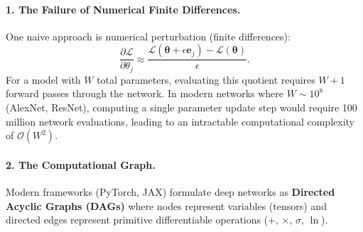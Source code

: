 \paragraph{1. The Failure of Numerical Finite Differences.}
One naive approach is numerical perturbation (finite differences):
\begin{equation}
\frac{\partial \mathcal{L}}{\partial \theta_j} \approx \frac{\mathcal{L}(\boldsymbol{\theta} + \epsilon \mathbf{e}_j) - \mathcal{L}(\boldsymbol{\theta})}{\epsilon}.
\end{equation}
For a model with $W$ total parameters, evaluating this quotient requires $W + 1$ forward passes through the network. In modern networks where $W \sim 10^8$ (AlexNet, ResNet), computing a single parameter update step would require 100 million network evaluations, leading to an intractable computational complexity of $\mathcal{O}(W^2)$.

\paragraph{2. The Computational Graph.}
Modern frameworks (PyTorch, JAX) formulate deep networks as \textbf{Directed Acyclic Graphs (DAGs)} where nodes represent variables (tensors) and directed edges represent primitive differentiable operations ($+$, $\times$, $\sigma$, $\ln$).

